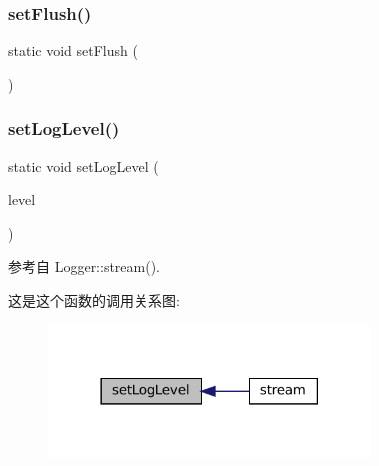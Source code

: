 \subsubsection{\texorpdfstring{set\+Flush()}{setFlush()}}
{\footnotesize\ttfamily static void set\+Flush (\begin{DoxyParamCaption}\item[{\hyperlink{classmuduo_1_1Logger_a355919f024ed4b42a85a6ddd28aede29}{Flush\+Func}}]{ }\end{DoxyParamCaption})\hspace{0.3cm}{\ttfamily [static]}}

\mbox{\label{classmuduo_1_1Logger_afdf5e54919991319a042cc6ad56c68ff}} 
\subsubsection{\texorpdfstring{set\+Log\+Level()}{setLogLevel()}}
{\footnotesize\ttfamily static void set\+Log\+Level (\begin{DoxyParamCaption}\item[{\hyperlink{classmuduo_1_1Logger_aca1fd1d8935433e6ba2e3918214e07f9}{Log\+Level}}]{level }\end{DoxyParamCaption})\hspace{0.3cm}{\ttfamily [static]}}



参考自 Logger\+::stream().

这是这个函数的调用关系图\+:
\nopagebreak
\begin{figure}[H]
\begin{center}
\leavevmode
\includegraphics[width=242pt]{classmuduo_1_1Logger_afdf5e54919991319a042cc6ad56c68ff_icgraph}
\end{center}
\end{figure}
\mbox{\label{classmuduo_1_1Logger_a665e9bd6827c71419e511203aa38b722}} 
